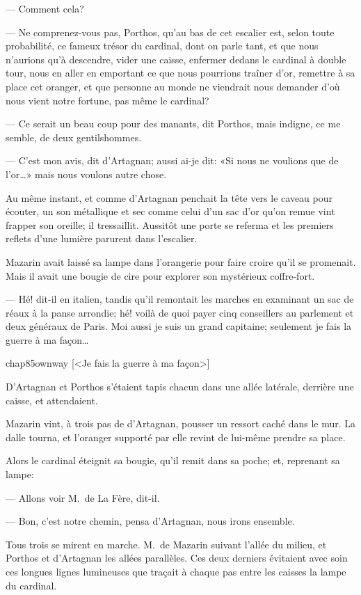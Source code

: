 — Comment cela?

— Ne comprenez-vous pas, Porthos, qu'au bas de cet escalier est, selon toute probabilité, ce fameux trésor du cardinal, dont on parle tant, et que nous n'aurions qu'à descendre, vider une caisse, enfermer dedans le cardinal à double tour, nous en aller en emportant ce que nous pourrions traîner d'or, remettre à sa place cet oranger, et que personne au monde ne viendrait nous demander d'où nous vient notre fortune, pas même le cardinal?

— Ce serait un beau coup pour des manants, dit Porthos, mais indigne, ce me semble, de deux gentilshommes.

— C'est mon avis, dit d'Artagnan; aussi ai-je dit: «Si nous ne voulions que de l'or\dots» mais nous voulons autre chose.

Au même instant, et comme d'Artagnan penchait la tête vers le caveau pour écouter, un son métallique et sec comme celui d'un sac d'or qu'on remue vint frapper son oreille; il tressaillit. Aussitôt une porte se referma et les premiers reflets d'une lumière parurent dans l'escalier.

Mazarin avait laissé sa lampe dans l'orangerie pour faire croire qu'il se promenait. Mais il avait une bougie de cire pour explorer son mystérieux coffre-fort.

— Hé! dit-il en italien, tandis qu'il remontait les marches en examinant un sac de réaux à la panse arrondie; hé! voilà de quoi payer cinq conseillers au parlement et deux généraux de Paris. Moi aussi je suis un grand capitaine; seulement je fais la guerre à ma façon\dots

\begin{colorbigpic}
	[\basicscale] 
	{chap85ownway}
	[<Je fais la guerre à ma façon>]
\end{colorbigpic}

D'Artagnan et Porthos s'étaient tapis chacun dans une allée latérale, derrière une caisse, et attendaient.

Mazarin vint, à trois pas de d'Artagnan, pousser un ressort caché dans le mur. La dalle tourna, et l'oranger supporté par elle revint de lui-même prendre sa place.

Alors le cardinal éteignit sa bougie, qu'il remit dans sa poche; et, reprenant sa lampe:

— Allons voir M.~de La Fère, dit-il.

— Bon, c'est notre chemin, pensa d'Artagnan, nous irons ensemble.

Tous trois se mirent en marche. M.~de Mazarin suivant l'allée du milieu, et Porthos et d'Artagnan les allées parallèles. Ces deux derniers évitaient avec soin ces longues lignes lumineuses que traçait à chaque pas entre les caisses la lampe du cardinal.

